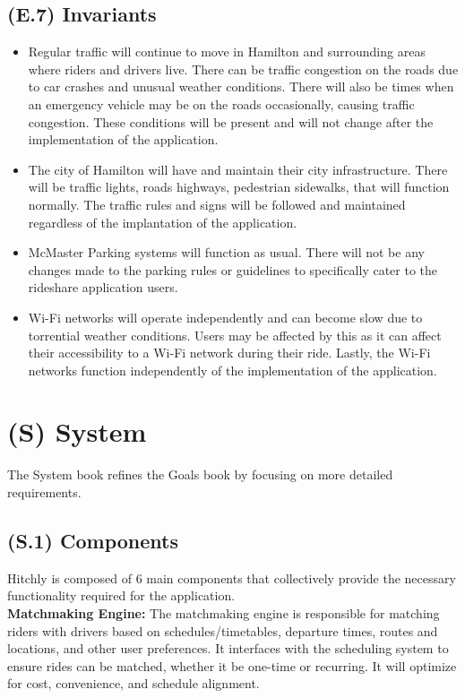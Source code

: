 \documentclass[12pt,letterpaper]{article}
\begin{document}
\subsection{(E.7) Invariants}
\begin{itemize}
\item Regular traffic will continue to move in Hamilton and surrounding areas where riders and drivers live. There can be traffic congestion on the roads due to car crashes and unusual weather conditions. There will also be times when an emergency vehicle may be on the roads occasionally, causing traffic congestion. These conditions will be present and will not change after the implementation of the application.  
\item The city of Hamilton will have and maintain their city infrastructure. There will be traffic lights, roads highways, pedestrian sidewalks, that will function normally.  The traffic rules and signs will be followed and maintained regardless of the implantation of the application. 
\item McMaster Parking systems will function as usual. There will not be any changes made to the parking rules or guidelines to specifically cater to the rideshare application users. 
\item Wi-Fi networks will operate independently and can become slow due to torrential weather conditions. Users may be affected by this as it can affect their accessibility to a Wi-Fi network during their ride. Lastly, the Wi-Fi networks function independently of the implementation of the application.  
\end{itemize}

\clearpage

\section{(S) System}
The System book refines the Goals book by focusing on more detailed requirements.

\subsection{(S.1) Components}
Hitchly is composed of 6 main components that collectively provide the necessary functionality required for the application. \\

\noindent \textbf{Matchmaking Engine:} The matchmaking engine is responsible for matching riders with drivers based on schedules/timetables, departure times, routes and locations, and other user preferences. 
It interfaces with the scheduling system to ensure rides can be matched, whether it be one-time or recurring. It will optimize for cost, convenience, and schedule alignment. \\
\end{document}
